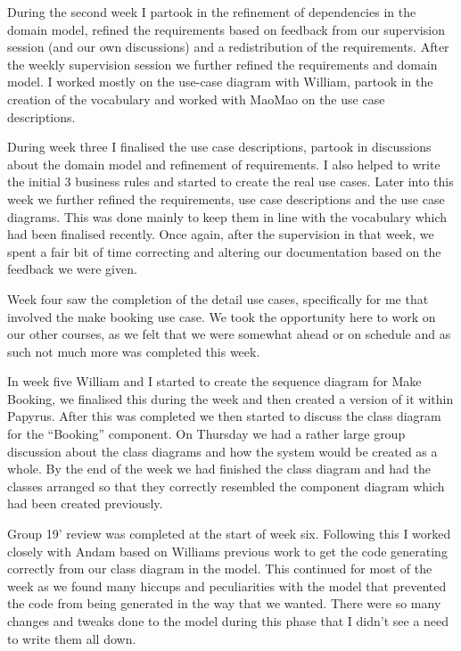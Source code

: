 \documentclass{article}
\begin{document}
During the second week I partook in the refinement of dependencies in the domain model, refined the requirements based on feedback from our supervision session (and our own discussions) and a redistribution of the requirements. After the weekly supervision session we further refined the requirements and domain model. I worked mostly on the use-case diagram with William, partook in the creation of the vocabulary and worked with MaoMao on the use case descriptions.
\par
During week three I finalised the use case descriptions, partook in discussions about the domain model and refinement of requirements. I also helped to write the initial 3 business rules and started to create the real use cases. Later into this week we further refined the requirements, use case descriptions and the use case diagrams. This was done mainly to keep them in line with the vocabulary which had been finalised recently. Once again, after the supervision in that week, we spent a fair bit of time correcting and altering our documentation based on the feedback we were given.
\par
Week four saw the completion of the detail use cases, specifically for me that involved the make booking use case. We took the opportunity here to work on our other courses, as we felt that we were somewhat ahead or on schedule and as such not much more was completed this week.
\par
In week five William and I started to create the sequence diagram for Make Booking, we finalised this during the week and then created a version of it within Papyrus. After this was completed we then started to discuss the class diagram for the “Booking” component. On Thursday we had a rather large group discussion about the class diagrams and how the system would be created as a whole. By the end of the week we had finished the class diagram and had the classes arranged so that they correctly resembled the component diagram which had been created previously.
\par
Group 19' review was completed at the start of week six. Following this I worked closely with Andam based on Williams previous work to get the code generating correctly from our class diagram in the model. This continued for most of the week as we found many hiccups and peculiarities with the model that prevented the code from being generated in the way that we wanted. There were so many changes and tweaks done to the model during this phase that I didn't see a need to write them all down. 
\par
\end{document}
